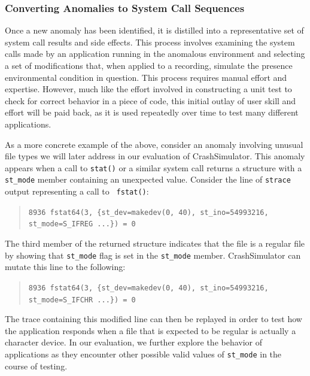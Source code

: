 \subsubsection{Converting Anomalies to System Call Sequences}

Once a new anomaly has been identified, it is distilled into a
representative set of system call results and side effects.
This process involves examining the
system calls made by an application running in the anomalous environment
and selecting a set of modifications that, when applied to a recording,
simulate the presence environmental condition in question.
This process requires manual effort and expertise.  However,
much like
the effort involved in constructing a unit test to check for correct
behavior in a piece of code, this initial outlay of
user skill and effort will be paid back, as it is
used repeatedly over time to test many different applications.

As a more concrete example of the above, consider an anomaly
involving unusual file types we will later address in our evaluation of
CrashSimulator.
This anomaly appears when a call to {\tt stat()} or a similar system
call returns a structure with a {\tt st\_mode}
member containing an unexpected
value. Consider the line of {\tt strace} output representing a call to {\tt
  fstat()}:
\begin{quote}
  {\tt 8936  fstat64(3, \{st\_dev=makedev(0, 40), st\_ino=54993216, st\_mode=S\_IFREG ...\}) = 0}
\end{quote}
The third member of the returned structure indicates that the file is a
regular file by showing that {\tt st\_mode} flag is set in the {\tt st\_mode}
member.  CrashSimulator can mutate this  line to the following:

\begin{quote}
  {\tt 8936  fstat64(3, \{st\_dev=makedev(0, 40), st\_ino=54993216, st\_mode=S\_IFCHR ...\}) = 0}
\end{quote}

The trace containing this modified line can then be replayed in order to
test how the application responds when a file that is expected to be
regular is actually a character device. In our evaluation, we further
explore the behavior of applications as they encounter other possible valid
values of {\tt st\_mode} in the course of testing.
